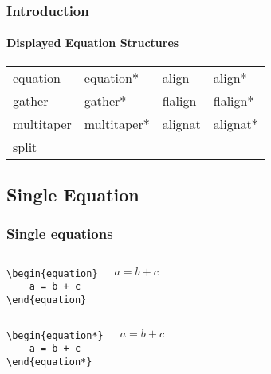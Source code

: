 \documentclass[12pt]{beamer}
\begin{document}
  \begin{frame}
    \frametitle{Introduction}
    \framesubtitle{Displayed Equation Structures}
    \begin{tabular}{l l l l}
      equation & equation$\ast$ & align & align$\ast$\\
      gather &   gather$\ast$   &   flalign  &   flalign$\ast$\\
      multitaper    &   multitaper$\ast$    &   alignat &   alignat$\ast$\\
      split
    \end{tabular}
  \end{frame}
\subsection{Single Equation}
\begin{frame}[fragile]
\frametitle{Single equations}
    \begin{columns}
        \begin{block}{}
        \begin{verbatim}
\begin{equation}
    a = b + c
\end{equation}
        \end{verbatim}
        \end{block}
        \begin{block}{}
        \begin{equation}
          a = b + c
        \end{equation}
        \end{block}
    \end{columns}

        \begin{columns}
        \begin{block}{}
        \begin{verbatim}
\begin{equation*}
    a = b + c
\end{equation*}
        \end{verbatim}
        \end{block}
        \begin{block}{}
        \begin{equation*}
          a = b + c
        \end{equation*}
        \end{block}
    \end{columns}
\end{frame}
\end{document}
